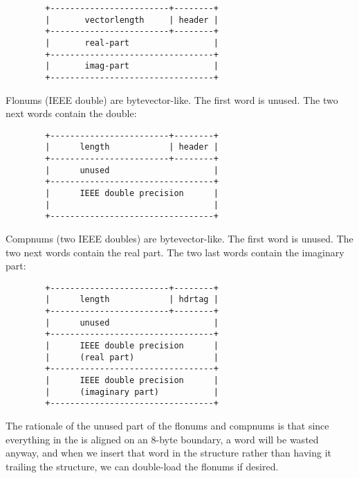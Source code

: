 \begin{verbatim}
        +------------------------+--------+
        |       vectorlength     | header |
        +------------------------+--------+
        |       real-part                 |
        +---------------------------------+
        |       imag-part                 |
        +---------------------------------+
\end{verbatim}

Flonums (IEEE double) are bytevector-like. The first word is unused.
The two next words contain the double:

\begin{verbatim}
        +------------------------+--------+
        |      length            | header |
        +------------------------+--------+
        |      unused                     |
        +---------------------------------+
        |      IEEE double precision      |
        |                                 |
        +---------------------------------+
\end{verbatim}

Compnums (two IEEE doubles) are bytevector-like. The first word is
unused.  The two next words contain the real part. The two last words
contain the imaginary part:

\begin{verbatim}
        +------------------------+--------+
        |      length            | hdrtag |
        +------------------------+--------+
        |      unused                     |
        +---------------------------------+
        |      IEEE double precision      |
        |      (real part)                |
        +---------------------------------+
        |      IEEE double precision      |
        |      (imaginary part)           |
        +---------------------------------+
\end{verbatim}

The rationale of the unused part of the flonums and compnums is that
since everything in the is aligned on an 8-byte boundary, a word will
be wasted anyway, and when we insert that word in the structure rather
than having it trailing the structure, we can double-load the flonums
if desired.


